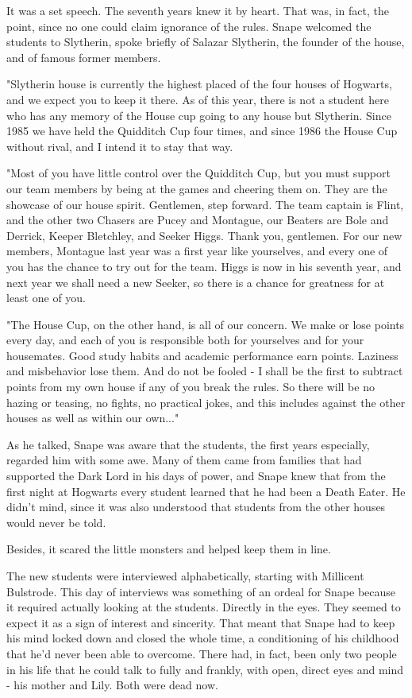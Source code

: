 \documentclass[a4paper,11pt]{article}
\begin{document}
It was a set speech. The seventh years knew it by heart. That was, in fact, the point, since no one could claim ignorance of the rules. Snape welcomed the students to Slytherin, spoke briefly of Salazar Slytherin, the founder of the house, and of famous former members.

"Slytherin house is currently the highest placed of the four houses of Hogwarts, and we expect you to keep it there. As of this year, there is not a student here who has any memory of the House cup going to any house but Slytherin. Since 1985 we have held the Quidditch Cup four times, and since 1986 the House Cup without rival, and I intend it to stay that way.

"Most of you have little control over the Quidditch Cup, but you must support our team members by being at the games and cheering them on. They are the showcase of our house spirit. Gentlemen, step forward. The team captain is Flint, and the other two Chasers are Pucey and Montague, our Beaters are Bole and Derrick, Keeper Bletchley, and Seeker Higgs. Thank you, gentlemen. For our new members, Montague last year was a first year like yourselves, and every one of you has the chance to try out for the team. Higgs is now in his seventh year, and next year we shall need a new Seeker, so there is a chance for greatness for at least one of you.

"The House Cup, on the other hand, is all of our concern. We make or lose points every day, and each of you is responsible both for yourselves and for your housemates. Good study habits and academic performance earn points. Laziness and misbehavior lose them. And do not be fooled - I shall be the first to subtract points from my own house if any of you break the rules. So there will be no hazing or teasing, no fights, no practical jokes, and this includes against the other houses as well as within our own..."

As he talked, Snape was aware that the students, the first years especially, regarded him with some awe. Many of them came from families that had supported the Dark Lord in his days of power, and Snape knew that from the first night at Hogwarts every student learned that he had been a Death Eater. He didn't mind, since it was also understood that students from the other houses would never be told.

Besides, it scared the little monsters and helped keep them in line.

The new students were interviewed alphabetically, starting with Millicent Bulstrode. This day of interviews was something of an ordeal for Snape because it required actually looking at the students. Directly in the eyes. They seemed to expect it as a sign of interest and sincerity. That meant that Snape had to keep his mind locked down and closed the whole time, a conditioning of his childhood that he'd never been able to overcome. There had, in fact, been only two people in his life that he could talk to fully and frankly, with open, direct eyes and mind - his mother and Lily. Both were dead now.
\end{document}
